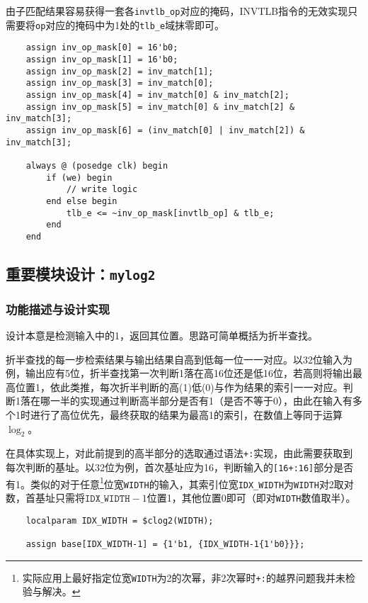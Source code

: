 \documentclass[UTF-8,twoside,c5size]{ctexart}
\begin{document}
    由子匹配结果容易获得一套各\texttt{invtlb\_op}对应的掩码，INVTLB指令的无效实现只需要将\texttt{op}对应的掩码中为1处的\texttt{tlb\_e}域抹零即可。
    
    \begin{verbatim}
    assign inv_op_mask[0] = 16'b0;
    assign inv_op_mask[1] = 16'b0;
    assign inv_op_mask[2] = inv_match[1];
    assign inv_op_mask[3] = inv_match[0];
    assign inv_op_mask[4] = inv_match[0] & inv_match[2];
    assign inv_op_mask[5] = inv_match[0] & inv_match[2] & inv_match[3];
    assign inv_op_mask[6] = (inv_match[0] | inv_match[2]) & inv_match[3];
    
    always @ (posedge clk) begin
        if (we) begin
            // write logic
        end else begin
            tlb_e <= ~inv_op_mask[invtlb_op] & tlb_e;
        end
    end
    \end{verbatim}
    
    \subsection{重要模块设计：\texttt{mylog2}}
    \subsubsection{功能描述与设计实现}
    
    设计本意是检测输入中的1，返回其位置。思路可简单概括为折半查找。
    
    折半查找的每一步检索结果与输出结果自高到低每一位一一对应。以32位输入为例，输出应有5位，折半查找第一次判断1落在高16位还是低16位，若高则将输出最高位置1，依此类推，每次折半判断的高(1)低(0)与作为结果的索引一一对应。判断1落在哪一半的实现通过判断高半部分是否有1（是否不等于0），由此在输入有多个1时进行了高位优先，最终获取的结果为最高1的索引，在数值上等同于运算$ \log_2 $。
    
    在具体实现上，对此前提到的高半部分的选取通过语法\texttt{+:}实现，由此需要获取到每次判断的基址。以32位为例，首次基址应为16，判断输入的\texttt{[16+:16]}部分是否有1。类似的对于任意\footnote{实际应用上最好指定位宽\texttt{WIDTH}为2的次幂，非2次幂时\texttt{+:}的越界问题我并未检验与解决。}位宽\texttt{WIDTH}的输入，其索引位宽\texttt{IDX\_WIDTH}为\texttt{WIDTH}对2取对数，首基址只需将$ \mathtt{IDX\_WIDTH}-1 $位置1，其他位置0即可（即对\texttt{WIDTH}数值取半）。
    
    \begin{verbatim}
    localparam IDX_WIDTH = $clog2(WIDTH);
    
    assign base[IDX_WIDTH-1] = {1'b1, {IDX_WIDTH-1{1'b0}}};
    \end{verbatim}
    
\end{document}

